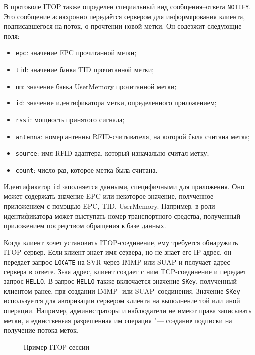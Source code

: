 В протоколе ITOP также определен специальный вид сообщения--ответа \texttt{NOTIFY}. Это сообщение асинхронно передаётся сервером для информирования клиента, подписавшегося на поток, о прочтении новой метки. Он содержит следующие поля:

\begin{itemize}
	\item \texttt{epc}: значение EPC прочитанной метки;
	\item \texttt{tid}: значение банка TID прочитанной метки;
	\item \texttt{um}: значение банка UserMemory прочитанной метки;
	\item \texttt{id}: значение идентификатора метки, определенного приложением;
	\item \texttt{rssi}: мощность принятого сигнала;
	\item \texttt{antenna}: номер антенны RFID-считывателя, на которой была считана метка;
	\item \texttt{source}: имя RFID-адаптера, который изначально считал метку;
	\item \texttt{count}: число раз, которое метка была считана.
\end{itemize}

Идентификатор \texttt{id} заполняется данными, специфичными для приложения. Оно может содержать значение EPC или некоторое значение, полученное приложением с помощью EPC, TID, UserMemory. Например, в роли идентификатора может выступать номер транспортного средства, полученный приложением посредством обращения к базе данных.

Когда клиент хочет установить ITOP-соединение, ему требуется обнаружить ITOP-сервер. Если клиент знает имя сервера, но не знает его IP-адрес, он передает запрос \texttt{LOCATE} на SVR через IMMP или SUAP и получает адрес сервера в ответе. Зная адрес, клиент создает с ним TCP-соединение и передает запрос \texttt{HELLO}. В запрос \texttt{HELLO} также включается значение \texttt{SKey}, полученный клиентом ранее, при создании IMMP- или SUAP--соединения. Значение \texttt{SKey} используется для авторизации сервером клиента на выполнение той или иной операции. Например, администраторы и наблюдатели не имеют права записывать метки, а единственная разрешенная им операция "--- создание подписки на получение потока меток.

\begin{figure}[ht]
  \caption{Пример ITOP-сессии}
  \label{fig:ch5_itop_session}
\end{figure}

